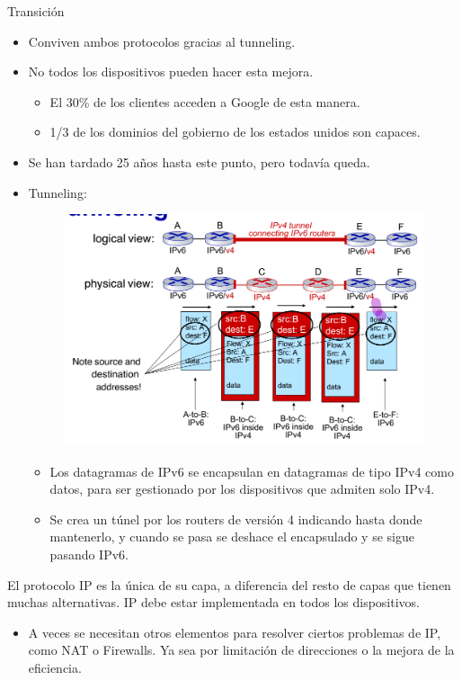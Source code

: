 \documentclass[12pt, twoside, openright]{report} %
\begin{document}
	Transición

    \begin{itemize}
    \item
      Conviven ambos protocolos gracias al tunneling.
    \item
      No todos los dispositivos pueden hacer esta mejora.

      \begin{itemize}
      \item
        El 30\% de los clientes acceden a Google de esta manera.
      \item
        1/3 de los dominios del gobierno de los estados unidos son
        capaces.
      \end{itemize}
    \item
      Se han tardado 25 años hasta este punto, pero todavía queda.
  \item
    Tunneling:
	\begin{figure}[H]
		{\includegraphics[scale=.3]{Untitled 37.png}}
	\end{figure}
    \begin{itemize}
    \item
      Los datagramas de IPv6 se encapsulan en datagramas de tipo IPv4
      como datos, para ser gestionado por los dispositivos que admiten
      solo IPv4.
    \item
      Se crea un túnel por los routers de versión 4 indicando hasta
      donde mantenerlo, y cuando se pasa se deshace el encapsulado y se
      sigue pasando IPv6.
    \end{itemize}
	\end{itemize}

	El protocolo IP es la única de su capa, a diferencia del resto de
    capas que tienen muchas alternativas. IP debe estar implementada en
    todos los dispositivos.
	\begin{itemize}
  \item
    A veces se necesitan otros elementos para resolver ciertos problemas
    de IP, como NAT o Firewalls. Ya sea por limitación de direcciones o
    la mejora de la eficiencia.
  \end{itemize}
\end{document}
